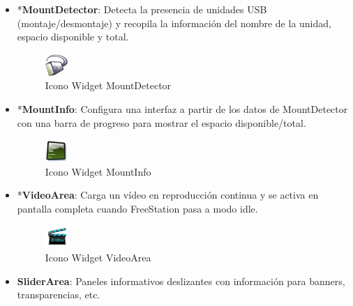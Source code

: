 \begin{itemize}
    \item{*\textbf{MountDetector}: Detecta la presencia de unidades USB 
    (montaje/desmontaje) y recopila la información del nombre de la unidad, 
    espacio disponible y total.
    
    \begin{figure}[ht]
        \begin{center}
            \includegraphics[height=32px]{src/img/widgets/mountdetector.png}
            \caption[Icono Widget MountDetector] {Icono Widget MountDetector}
        \end{center}
    \end{figure}}
    
    \item{*\textbf{MountInfo}: Configura una interfaz a partir de los datos de
    MountDetector con una barra de progreso para mostrar el espacio disponible/total.
    
    \begin{figure}[ht]
        \begin{center}
            \includegraphics[height=32px]{src/img/widgets/mountinfo.png}
            \caption[Icono Widget MountInfo] {Icono Widget MountInfo}
        \end{center}
    \end{figure}}
    
    \item{*\textbf{VideoArea}: Carga un vídeo en reproducción continua y se
    activa en pantalla completa cuando FreeStation pasa a modo idle.
    
    \begin{figure}[ht]
        \begin{center}
            \includegraphics[height=32px]{src/img/widgets/videoarea.png}
            \caption[Icono Widget VideoArea] {Icono Widget VideoArea}
        \end{center}
    \end{figure}}

    \item{\textbf{SliderArea}: Paneles informativos deslizantes con información
    para banners, transparencias, etc.}


\end{itemize}
